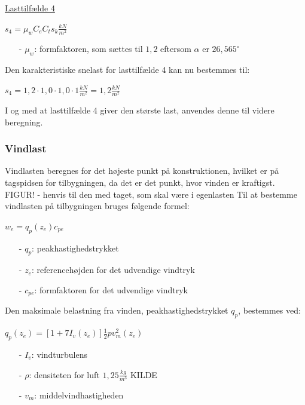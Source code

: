 \underline{Lasttilfælde 4}
\begin{center}
	$s_4=\mu_wC_eC_ts_k \frac{kN}{m^2}$
\end{center}
\begin{itemize}
	\item[-] $\mu_w$: formfaktoren, som sættes til $1,\!2$ eftersom $\alpha$ er $26,\!565^{\circ}$ \citep[ kapitel 5.3.3]{EU91}
\end{itemize}
Den karakteristiske snelast for lasttilfælde 4 kan nu bestemmes til:
\begin{center}
	$s_4=1,\!2\cdot 1,\!0\cdot 1,\!0\cdot 1 \frac{kN}{m^2}=1,\!2 \frac{kN}{m^2}$
\end{center}
I og med at lasttilfælde 4 giver den største last, anvendes denne til videre beregning.

\subsubsection{Vindlast}
Vindlasten beregnes for det højeste punkt på konstruktionen, hvilket er på tagspidsen for tilbygningen, da det er det punkt, hvor vinden er kraftigst.
\newline
\newline
FIGUR! - henvis til den med taget, som skal være i egenlasten
\newline
\newline
Til at bestemme vindlasten på tilbygningen bruges følgende formel:	
\begin{center} $w_e=q_p(z_e)c_{pe}$
\end{center}
\begin{itemize}
	\item[-] $q_p$: peakhastighedstrykket
	\item[-] $z_e$: referencehøjden for det udvendige vindtryk
	\item[-] $c_{pe}$: formfaktoren for det udvendige vindtryk
\end{itemize}
Den maksimale belastning fra vinden, peakhastighedstrykket $q_p$, bestemmes ved:
\begin{center}
$q_p(z_e)=[1+7I_v(z_e)]\frac{1}{2}pv_m^2(z_e)$
\end{center}
\begin{itemize}
	\item[-] $I_v$: vindturbulens
	\item[-] $\rho$: densiteten for luft $1,\!25 \frac{kg}{m^3}$ KILDE
	\item[-] $v_m$: middelvindhastigheden
\end{itemize}
